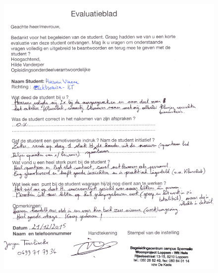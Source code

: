 \documentclass[a4paper,12pt]{article}
\begin{document}
\begin{figure}[H]
  \centering
  \includegraphics[width=\textwidth,height=0.9\textheight,keepaspectratio]{./evaluatie.jpg}
\end{figure}
\end{document}

